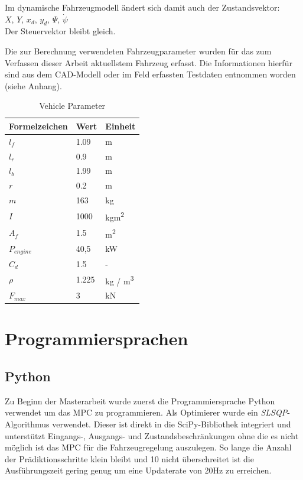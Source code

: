 \documentclass{like}
\begin{document}
Im dynamische Fahrzeugmodell ändert sich damit auch der Zustandsvektor: \\
\(X\), \(Y\), \(x_d\), \(y_d\), \(\Psi\), \(\dot{\psi}\) \\
Der Steuervektor bleibt gleich.

Die zur Berechnung verwendeten Fahrzeugparameter wurden für das zum Verfassen dieser Arbeit aktuellstem Fahrzeug erfasst. Die Informationen hierfür sind aus dem CAD-Modell oder im Feld erfassten Testdaten entnommen worden (siehe Anhang).


\begin{table}[]
	\centering
	\begin{tabular}{l|l|l}
		\hline
		Formelzeichen	& Wert & Einheit \\ \hline
		\(l_f\)	&	1.09 & m\\
		\(l_r\)	&	0.9 & m\\
		\(l_b\)	&	1.99 & m \\
		\(r\)	&	0.2 & m \\
		\(m\)	&  	163 & kg\\
		\(I\)	&  	1000 & kgm\textsuperscript{2}\\
		\(A_f\)	&  	1.5 & m\textsuperscript{2}\\
		\(P_{engine}\) &  40,5 & kW\\
		\(C_d\)	&  	1.5 & - \\
		\(\rho\)	&  	1.225 & kg / m\textsuperscript{3}\\
		\(F_{max}\)	&  	3 & kN \\ 
	\end{tabular}
	\caption{Vehicle Parameter}
	\label{vehicleParam}
\end{table}





\section{Programmiersprachen}
\subsection{Python}

Zu Beginn der Masterarbeit wurde zuerst die Programmiersprache Python verwendet um das \ac{MPC} zu programmieren. Als Optimierer wurde ein \emph{\ac{SLSQP}}-Algorithmus verwendet. Dieser ist direkt in die SciPy-Bibliothek integriert und unterstützt Eingangs-, Ausgangs- und Zustandsbeschränkungen ohne die es nicht möglich ist das \ac{MPC} für die Fahrzeugregelung auszulegen. So lange die Anzahl der Prädiktionsschritte klein bleibt und 10 nicht überschreitet ist die Ausführungszeit gering genug um eine Updaterate von 20Hz zu erreichen. 
\end{document}
